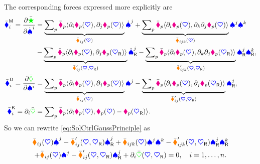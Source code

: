 The corresponding forces expressed more explicitly are 
\begin{subequations}\label{eq:CtrlGaussPrincipleForces} 
\begin{align}
 \genForceInertiaCoeffC{\LidxI} = \pdiff[\accEnergyC]{\sysVelCoeffd{\LidxI}} &= 
   \underbrace{\sumParticles \particleMassC{\PidxI} \sProd{\dirDiff{\LidxI} \particlePos{\PidxI}(\sysCoord)}{\dirDiff{\LidxII} \particlePos{\PidxI}(\sysCoord)}}_{\sysInertiaMatCoeffC{\LidxI\LidxII}(\sysCoord)} \sysVelCoeffd{\LidxII}
 + \underbrace{\sumParticles \particleMassC{\PidxI} \sProd{\dirDiff{\LidxI} \particlePos{\PidxI}(\sysCoord)}{\dirDiff{\LidxIII} \dirDiff{\LidxII} \particlePos{\PidxI}(\sysCoord)}}_{\ConnCoeffLC{\LidxI}{\LidxII}{\LidxIII}(\sysCoord)} \sysVelCoeff{\LidxII} \sysVelCoeff{\LidxIII}
\nonumber\\
 &- \underbrace{\sumParticles \particleMassC{\PidxI} \sProd{\dirDiff{\LidxI} \particlePos{\PidxI}(\sysCoord)}{\dirDiff{\LidxII} \particlePos{\PidxI}(\sysCoordR)}}_{\sysInertiaMatCoeffC{\LidxI\LidxII}'(\sysCoord,\sysCoordR)} \sysVelCoeffRd{\LidxII}
 - \underbrace{\sumParticles \particleMassC{\PidxI} \sProd{\dirDiff{\LidxI} \particlePos{\PidxI}(\sysCoord)}{\dirDiff{\LidxIII} \dirDiff{\LidxII} \particlePos{\PidxI}(\sysCoordR)}}_{\ConnCoeffLC{\LidxI}{\LidxII}{\LidxIII}'(\sysCoord, \sysCoordR)} \sysVelCoeffR{\LidxII} \sysVelCoeffR{\LidxIII},
\\
 \genForceDissCoeffC{\LidxI} = \pdiff[\dissFktC]{\sysVelCoeff{\LidxI}} &=
 \underbrace{\sumParticles \particleDampingC{\PidxI} \sProd{\dirDiff{\LidxI} \particlePos{\PidxI}(\sysCoord)}{\dirDiff{\LidxII} \particlePos{\PidxI}(\sysCoord)}}_{\sysDissMatCoeffC{\LidxI\LidxII}(\sysCoord)} \sysVelCoeff{\LidxII}
 - \underbrace{\sumParticles \particleDampingC{\PidxI} \sProd{\dirDiff{\LidxI} \particlePos{\PidxI}(\sysCoord)}{\dirDiff{\LidxII} \particlePos{\PidxI}(\sysCoordR)}}_{\sysDissMatCoeffC{\LidxI\LidxII}'(\sysCoord, \sysCoordR)} \sysVelCoeffR{\LidxII},
\\
 \genForceStiffCoeffC{\LidxI} = \dirDiff{\LidxI} \potentialEnergyC &= \sumParticles \particleStiffnessC{\PidxI} \sProd{\partial_\LidxI \particlePos{\PidxI}(\sysCoord)}{\particlePos{\PidxI}(\sysCoord) - \particlePos{\PidxI}(\sysCoordR)}
 .
\end{align}
\end{subequations}
So we can rewrite \eqref{eq:SolCtrlGaussPrinciple} as
\begin{multline}\label{eq:SolCtrlGaussPrincipleExplicit}
 \sysInertiaMatCoeffC{\LidxI\LidxII}(\sysCoord) \sysVelCoeffd{\LidxII}
 - \sysInertiaMatCoeffC{\LidxI\LidxII}'(\sysCoord,\sysCoordR) \sysVelCoeffRd{\LidxII}
 + \ConnCoeffLC{\LidxI}{\LidxII}{\LidxIII}(\sysCoord) \sysVelCoeff{\LidxII} \sysVelCoeff{\LidxIII}
 - \ConnCoeffLC{\LidxI}{\LidxII}{\LidxIII}'(\sysCoord, \sysCoordR) \sysVelCoeffR{\LidxII} \sysVelCoeffR{\LidxIII}
\\
 + \sysDissMatCoeffC{\LidxI\LidxII}(\sysCoord) \sysVelCoeff{\LidxII}
 - \sysDissMatCoeffC{\LidxI\LidxII}'(\sysCoord, \sysCoordR) \sysVelCoeffR{\LidxII}
 + \dirDiff{\LidxI} \potentialEnergyC(\sysCoord, \sysCoordR)
 = 0,\quad \LidxI = 1,\ldots,\dimConfigSpace.
\end{multline}

